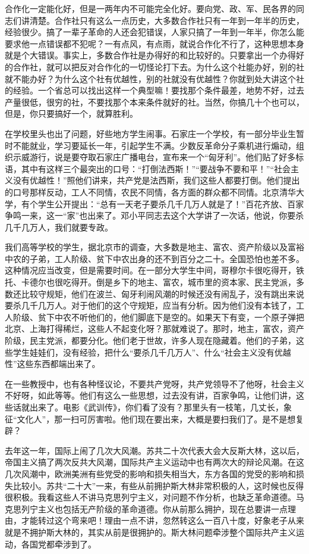合作化一定能化好，但是一两年内不可能完全化好。要向党、政、军、民各界的同志们讲清楚。合作社只有这么一点历史，大多数合作社只有一年到一年半的历史，经验很少。搞了一辈子革命的人还会犯错误，人家只搞了一年到一年半，你怎么能要求他一点错误都不犯呢？一有点风，有点雨，就说合作化不行了，这种思想本身就是个大错误。事实上，多数合作社是办得好的和比较好的。只要拿出一个办得好的合作社，就可以把反对合作化的一切怪论打下去。为什么这个社能办好，别的社就不能办好？为什么这个社有优越性，别的社就没有优越性？你就到处大讲这个社的经验。一个省总可以找出这样一个典型嘛！要找那个条件最差，地势不好，过去产量很低，很穷的社，不要找那个本来条件就好的社。当然，你搞几十个也可以，但是，你只要搞好一个，就算胜利。

在学校里头也出了问题，好些地方学生闹事。石家庄一个学校，有一部分毕业生暂时不能就业，学习要延长一年，引起学生不满。少数反革命分子乘机进行煽动，组织示威游行，说是要夺取石家庄广播电台，宣布来一个“匈牙利”。他们贴了好多标语，其中有这样三个最突出的口号：“打倒法西斯！”“要战争不要和平！”“社会主义没有优越性！”照他们讲来，共产党是法西斯，我们这些人都要打倒。他们提出的口号那样反动，工人不同情，农民不同情，各方面的群众都不同情。北京清华大学，有个学生公开提出：“总有一天老子要杀几千几万人就是了！”百花齐放、百家争鸣一来，这一“家”也出来了。邓小平同志去这个大学讲了一次话，他说，你要杀几千几万人，我们就要专政。

我们高等学校的学生，据北京市的调查，大多数是地主、富农、资产阶级以及富裕中农的子弟，工人阶级、贫下中农出身的还不到百分之二十。全国恐怕也差不多。这种情况应当改变，但是需要时间。在一部分大学生中间，哥穆尔卡很吃得开，铁托、卡德尔也很吃得开。倒是乡下的地主、富农，城市里的资本家、民主党派，多数还比较守规矩，他们在波兰、匈牙利闹风潮的时候还没有闹乱子，没有跳出来说要杀几千几万人。对于他们的这个守规矩，应当有分析。因为他们没有本钱了，工人阶级、贫下中农不听他们的，他们脚底下是空的。如果天下有变，一个原子弹把北京、上海打得稀烂，这些人不起变化呀？那就难说了。那时，地主，富农，资产阶级，民主党派，都要分化。他们老于世故，许多人现在隐藏着。他们的子弟，这些学生娃娃们，没有经验，把什么“要杀几千几万人”、什么“社会主义没有优越性”这些东西都端出来了。

在一些教授中，也有各种怪议论，不要共产党呀，共产党领导不了他呀，社会主义不好呀，如此等等。他们有这么一些思想，过去没有讲，百家争鸣，让他们讲，这些话就出来了。电影《武训传》，你们看了没有？那里头有一枝笔，几丈长，象征“文化人”，那一扫可厉害啦。他们现在要出来，大概是要扫我们了。是不是想复辟？

去年这一年，国际上闹了几次大风潮。苏共二十次代表大会大反斯大林，这以后，帝国主义搞了两次反共大风潮，国际共产主义运动中也有两次大的辩论风潮。在这几次风潮中，欧洲美洲有些党受的影响和损失相当大，东方各国的党受的影响和损失比较小。苏共“二十大”一来，有些从前拥护斯大林非常积极的人，这时候也反得很积极。我看这些人不讲马克思列宁主义，对问题不作分析，也缺乏革命道德。马克思列宁主义也包括无产阶级的革命道德。你从前那么拥护，现在总要讲一点理由，才能转过这个弯来吧！理由一点不讲，忽然转这么一百八十度，好象老子从来就是不拥护斯大林的，其实从前是很拥护的。斯大林问题牵涉整个国际共产主义运动，各国党都牵涉到了。

